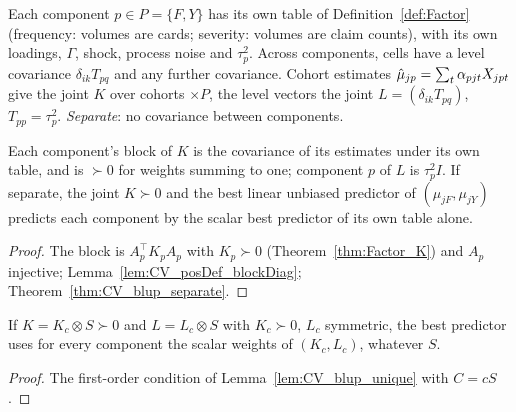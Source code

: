 \begin{definition}\label{def:FreqSev}
  \leanok
  Each component $p \in P = \{F, Y\}$ has its own table of Definition~\ref{def:Factor}
  (frequency: volumes are cards; severity: volumes are claim counts), with its own loadings,
  $\Gamma$, shock, process noise and $\tau_p^2$. Across components, cells have a level covariance
  $\delta_{ik}T_{pq}$ and any further covariance. Cohort estimates
  $\hat\mu_{jp} = \sum_t\alpha_{pjt}X_{jpt}$ give the joint $K$ over cohorts $\times P$, the level
  vectors the joint $L = (\delta_{ik}T_{pq})$, $T_{pp} = \tau_p^2$. \emph{Separate}: no
  covariance between components.
\end{definition}

\begin{theorem}[Joint $=$ separate for frequency and severity]\label{thm:FreqSev_separate}
  \leanok
  Each component's block of $K$ is the covariance of its estimates under its own table, and is
  $\succ 0$ for weights summing to one; component $p$ of $L$ is $\tau_p^2 I$. If separate, the
  joint $K \succ 0$ and the best linear unbiased predictor of $(\mu_{jF}, \mu_{jY})$ predicts
  each component by the scalar best predictor of its own table alone.
\end{theorem}
\begin{proof}
  \leanok
  The block is $A_p^\top K_p A_p$ with $K_p \succ 0$ (Theorem~\ref{thm:Factor_K}) and $A_p$
  injective; Lemma~\ref{lem:CV_posDef_blockDiag}; Theorem~\ref{thm:CV_blup_separate}.
\end{proof}

\begin{theorem}[Joint $=$ separate without block diagonality]\label{thm:CV_blupW_kronecker}
  \leanok
  If $K = K_c \otimes S \succ 0$ and $L = L_c \otimes S$ with $K_c \succ 0$, $L_c$ symmetric, the
  best predictor uses for every component the scalar weights of $(K_c, L_c)$, whatever $S$.
\end{theorem}
\begin{proof}
  \leanok
  The first-order condition of Lemma~\ref{lem:CV_blup_unique} with $C = cS$.
\end{proof}

